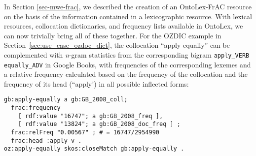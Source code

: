 \documentclass[output=paper,colorlinks,citecolor=brown]{langscibook}
\begin{document}
In Section \ref{sec-mwe-frac}, we described the creation of an OntoLex-FrAC resource on the basis of the information contained in a lexicographic resource. With lexical resources, collocation dictionaries, and frequency lists available in OntoLex, we can now trivially bring all of these together.
%
%
%
%
For the OZDIC example in Section~\ref{sec:use_case_ozdoc_dict}, the collocation “apply equally” can be complemented with \textit{n}-gram statistics from the corresponding bigram \texttt{apply\_VERB equally\_ADV} in Google Books, with frequencies of the corresponding lexemes and a relative frequency  calculated based on the frequency of the collocation and the frequency of its head (``apply') in all possible inflected forms: %

{\listingsize
\begin{verbatim}
gb:apply-equally a gb:GB_2008_coll;
  frac:frequency
    [ rdf:value "16747"; a gb:GB_2008_freq ],
    [ rdf:value "13824"; a gb:GB_2008_doc_freq ] ;
  frac:relFreq "0.00567" ; # = 16747/2954990
  frac:head :apply-v .
oz:apply-equally skos:closeMatch gb:apply-equally .
\end{verbatim}
}
\end{document}

